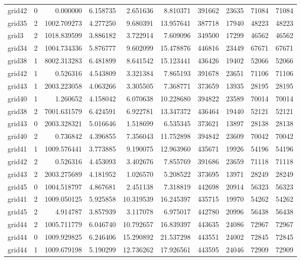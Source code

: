 \begin{longtable}{|l|r|r|r|r|r|r|r|r|r|}
grid42 & 0 & 0.000000 & 6.158735 & 2.651636 & 8.810371 & 391662 & 23635 & 71084 & 71084 \\
grid35 & 2 & 1002.709273 & 4.277250 & 9.680391 & 13.957641 & 387718 & 17940 & 48223 & 48223 \\
grid3 & 2 & 1018.839599 & 3.886182 & 3.722914 & 7.609096 & 349500 & 17299 & 46562 & 46562 \\
grid34 & 2 & 1004.734336 & 5.876777 & 9.602099 & 15.478876 & 446816 & 23449 & 67671 & 67671 \\
grid38 & 1 & 8002.313283 & 6.481899 & 8.641542 & 15.123441 & 436426 & 19402 & 52066 & 52066 \\
grid42 & 1 & 0.526316 & 4.543809 & 3.321384 & 7.865193 & 391678 & 23651 & 71106 & 71106 \\
grid43 & 1 & 2003.223058 & 4.063266 & 3.305505 & 7.368771 & 373659 & 13935 & 28195 & 28195 \\
grid40 & 1 & 1.260652 & 4.158042 & 6.070638 & 10.228680 & 394822 & 23589 & 70014 & 70014 \\
grid38 & 2 & 7001.631579 & 6.424591 & 6.922781 & 13.347372 & 436464 & 19440 & 52121 & 52121 \\
grid43 & 0 & 2003.328321 & 5.016646 & 1.518699 & 6.535345 & 373621 & 13897 & 28138 & 28138 \\
grid40 & 2 & 0.736842 & 4.396855 & 7.356043 & 11.752898 & 394842 & 23609 & 70042 & 70042 \\
grid41 & 1 & 1009.576441 & 3.773885 & 9.190075 & 12.963960 & 435671 & 19926 & 54196 & 54196 \\
grid42 & 2 & 0.526316 & 4.453093 & 3.402676 & 7.855769 & 391686 & 23659 & 71118 & 71118 \\
grid43 & 2 & 2003.275689 & 4.181952 & 1.026570 & 5.208522 & 373695 & 13971 & 28249 & 28249 \\
grid45 & 0 & 1004.518797 & 4.867681 & 2.451138 & 7.318819 & 442698 & 20914 & 56323 & 56323 \\
grid41 & 2 & 1009.050125 & 5.925858 & 10.319539 & 16.245397 & 435715 & 19970 & 54262 & 54262 \\
grid45 & 2 & 4.914787 & 3.857939 & 3.117078 & 6.975017 & 442780 & 20996 & 56438 & 56438 \\
grid44 & 2 & 1005.711779 & 6.046740 & 10.792657 & 16.839397 & 443635 & 24086 & 72967 & 72967 \\
grid44 & 0 & 1009.929825 & 6.246406 & 15.290892 & 21.537298 & 443551 & 24002 & 72845 & 72845 \\
grid44 & 1 & 1009.679198 & 5.190299 & 12.736262 & 17.926561 & 443595 & 24046 & 72909 & 72909 \\

\end{longtable}

